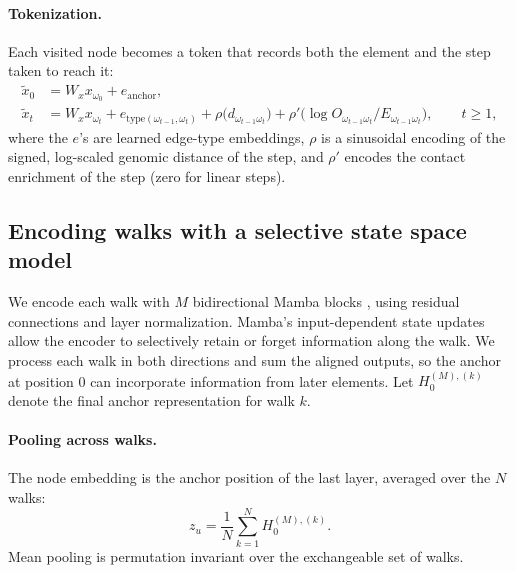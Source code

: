 \paragraph{Tokenization.}
Each visited node becomes a token that records both the element and the step taken to reach it:
\begin{align}
  \tilde{x}_0 &= W_x x_{\omega_0}+e_{\mathrm{anchor}},\label{eq:token0}\\
  \tilde{x}_t &= W_x x_{\omega_t}+e_{\mathrm{type}(\omega_{t-1},\omega_t)}
  +\rho\big(d_{\omega_{t-1}\omega_t}\big)
  +\rho'\big(\log O_{\omega_{t-1}\omega_t}/E_{\omega_{t-1}\omega_t}\big),
  \qquad t\ge 1,\label{eq:token}
\end{align}
where the $e$'s are learned edge-type embeddings, $\rho$ is a sinusoidal encoding of the signed, log-scaled genomic distance of the step, and $\rho'$ encodes the contact enrichment of the step (zero for linear steps).


\subsection{Encoding walks with a selective state space model}
We encode each walk with $M$ bidirectional Mamba blocks \cite{gu2023mamba}, using residual connections and layer normalization. Mamba's input-dependent state updates allow the encoder to selectively retain or forget information along the walk. We process each walk in both directions and sum the aligned outputs, so the anchor at position 0 can incorporate information from later elements. Let $H^{(M),(k)}_0$ denote the final anchor representation for walk $k$.

\paragraph{Pooling across walks.}
The node embedding is the anchor position of the last layer, averaged over the $N$ walks:
\begin{equation}\label{eq:pool}
  z_u=\frac{1}{N}\sum_{k=1}^{N}H^{(M),(k)}_{0}.
\end{equation}
Mean pooling is permutation invariant over the exchangeable set of walks.


